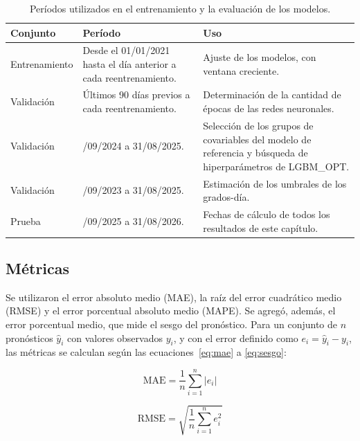 \begin{table}[H]
	\centering
	\caption{Períodos utilizados en el entrenamiento y la evaluación de los modelos.}
	\label{tab:particion_datos}
	\footnotesize
	\setlength{\tabcolsep}{4pt}
	\renewcommand{\arraystretch}{1.15}
	\begin{tabularx}{\textwidth}{
			@{}
			>{\raggedright\arraybackslash\hsize=0.6\hsize}X
			>{\raggedright\arraybackslash\hsize=1.0\hsize}X
			>{\raggedright\arraybackslash\hsize=1.4\hsize}X
			@{}
		}
		\toprule
		\textbf{Conjunto} & \textbf{Período} & \textbf{Uso} \\
		\midrule
		Entrenamiento & Desde el 01/01/2021 hasta el día anterior a cada reentrenamiento. & Ajuste de los modelos, con ventana creciente. \\
		Validación & Últimos 90 días previos a cada reentrenamiento. & Determinación de la cantidad de épocas de las redes neuronales. \\
		Validación & 01/09/2024 a 31/08/2025. & Selección de los grupos de covariables del modelo de referencia y búsqueda de hiperparámetros de LGBM\_OPT. \\
		Validación & 01/09/2023 a 31/08/2025. & Estimación de los umbrales de los grados-día. \\
		Prueba & 01/09/2025 a 31/08/2026. & Fechas de cálculo de todos los resultados de este capítulo. \\
		\bottomrule
	\end{tabularx}
\end{table}

\subsection{Métricas}
\label{subsec:metricas}

Se utilizaron el error absoluto medio (MAE), la raíz del error cuadrático medio (RMSE) y el error porcentual absoluto medio (MAPE). Se agregó, además, el error porcentual medio, que mide el sesgo del pronóstico. Para un conjunto de $n$ pronósticos $\hat{y}_i$ con valores observados $y_i$, y con el error definido como $e_i = \hat{y}_i - y_i$, las métricas se calculan según las ecuaciones~\ref{eq:mae} a \ref{eq:sesgo}:

\begin{equation}
	\mathrm{MAE} = \frac{1}{n} \sum_{i=1}^{n} \left| e_i \right|
	\label{eq:mae}
\end{equation}

\begin{equation}
	\mathrm{RMSE} = \sqrt{\frac{1}{n} \sum_{i=1}^{n} e_i^{2}}
	\label{eq:rmse}
\end{equation}

